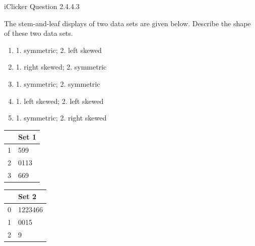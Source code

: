 \documentclass[14pt]{beamer}\usepackage[]{graphicx}\usepackage[]{color}
\begin{document}
\begin{frame}[fragile]{iClicker Question 2.4.4.3}

The stem-and-leaf displays of two data sets are given below. Describe  the shape of these two data sets.

\vspace{3mm}

\begin{minipage}[ht]{7.5cm}

\begin{enumerate}
\item 1. symmetric; 2. left skewed
\item 1. right skewed; 2. symmetric
\item 1. symmetric; 2. symmetric
\item 1. left skewed; 2. left skewed
\item 1. symmetric; 2. right skewed
\end{enumerate}
\end{minipage}
\begin{minipage}[ht]{2cm}

{\footnotesize{
\begin{tabular}{@{} r|l @{}} \hline
 & Set 1 \\ \hline
1 & 599 \\
2 & 0113 \\
3 & 669 \\ \hline
\end{tabular}

\begin{tabular}{@{} r|l @{}} \hline
& Set 2 \\ \hline
0 & 1223466 \\
1 & 0015 \\
2 & 9 \\ \hline
\end{tabular}
}}
\end{minipage}
\end{frame}
\end{document}

